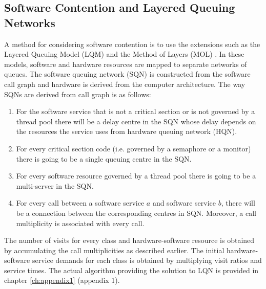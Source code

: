  \subsection{Software Contention and Layered Queuing Networks} 
 A method for considering software contention is to use the extensions such as the Layered Queuing Model (LQM) and the Method of Layers (MOL) \cite{rolia_method_1995}. In these models, software and hardware resources are mapped to separate networks of queues. The software queuing network  \cite{rolia_method_1995} (SQN) is constructed from the software call graph and hardware is derived from the computer architecture. 
 The way SQNs are derived from call graph is as follows:  
 \begin{enumerate} 
     \item For the software service that is not a critical section or is not governed by a thread pool there will be a delay centre in the SQN whose delay depends on the resources the service uses from hardware queuing network (HQN). 
 \item For every critical section code (i.e. governed by a semaphore or a monitor) there is going to be a single queuing centre in the SQN.
 \item For every software resource governed by a thread pool there is going to be a multi-server in the SQN. 
  \item For every call between a software service $a$ and software service $b$, there will be a connection between the corresponding centres in SQN. Moreover, a call multiplicity is associated with every call.  
 \end{enumerate}
  
   The number of visits for every class and hardware-software resource is obtained by accumulating the call multiplicities as described earlier. The initial hardware-software service demands for each class is obtained by multiplying visit ratios and service times. 
The actual algorithm providing the solution to LQN is provided in chapter \ref{ch:appendix1} (appendix 1).  
  
